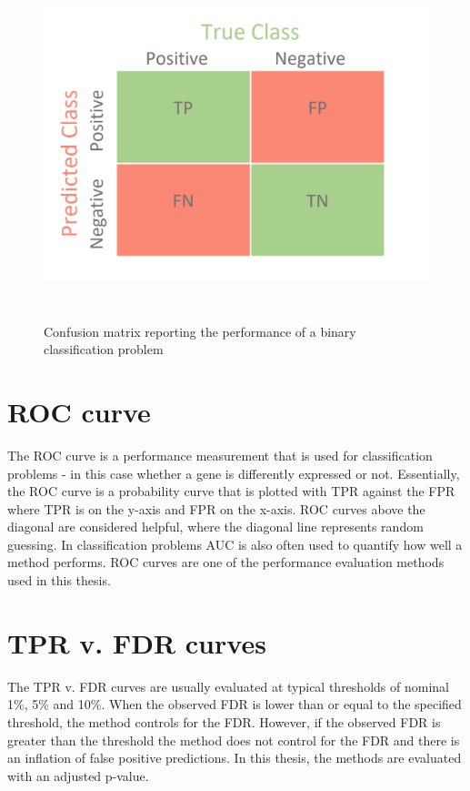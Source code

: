 \begin{figure}[!htb]
\begin{center}
\includegraphics[width=6in,height=4in]{figure/confusion_matrix.png}
\end{center}
\caption{Confusion matrix reporting the performance of a binary classification problem}
\label{fig:confusion_matrix}
\end{figure}
\FloatBarrier

\section{ROC curve}
The ROC curve is a performance measurement that is used for classification problems - in this case whether a gene is differently expressed or not. Essentially, the ROC curve is a probability curve that is plotted with TPR against the FPR where TPR is on the y-axis and FPR on the x-axis. ROC curves above the diagonal are considered helpful, where the diagonal line represents random guessing. In classification problems AUC is also often used to quantify how well a method performs. ROC curves are one of the performance evaluation methods used in this thesis.

\section{TPR v. FDR curves}
The TPR v. FDR curves are usually evaluated at typical thresholds of nominal 1\%, 5\% and 10\%. When the observed FDR is lower than or equal to the specified threshold, the method controls for the FDR. However, if the observed FDR is greater than the threshold the method does not control for the FDR and there is an inflation of false positive predictions. In this thesis, the methods are evaluated with an adjusted p-value.

